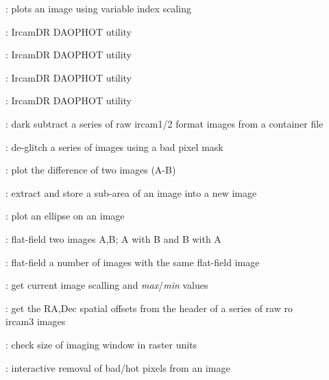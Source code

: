 \begin{description}
\item []: plots an image using variable
index scaling

\item []: {\sc IrcamDR} DAOPHOT utility

\item []: {\sc IrcamDR} DAOPHOT utility

\item []: {\sc IrcamDR} DAOPHOT utility

\item []: {\sc IrcamDR} DAOPHOT utility

\item []: dark subtract a series of raw {\sc
ircam1/2} format images from a container file

\item []: de-glitch a series of images using a
bad pixel mask

\item []: plot the difference of two images (A-B)

\item []: extract and store a sub-area of an
image into a new image

\item []: plot an ellipse on an image

\item []: flat-field two images A,B;  A with B
and B with A

\item []: flat-field a number of images with
the same flat-field image

\item []: get current image scalling and {\it
max}/{\it min} values

\item []: get the RA,Dec spatial offsets from
the header of a series of raw {\sc ro} {\sc ircam3} images

\item []: check size of imaging window in
raster units

\item []: interactive removal of bad/hot pixels
from an image


\end{description}
